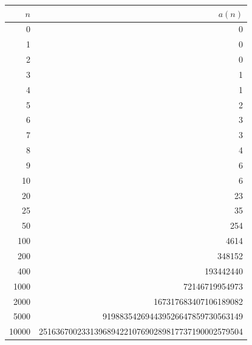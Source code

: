 \begin{tabular}{r r}
$n$ & $a(n)$ \\
\hline
0 & 0 \\
1 & 0 \\
2 & 0 \\
3 & 1 \\
4 & 1 \\
5 & 2 \\
6 & 3 \\
7 & 3 \\
8 & 4 \\
9 & 6 \\
10 & 6 \\
20 & 23 \\
25 & 35 \\
50 & 254 \\
100 & 4614 \\
200 & 348152 \\
400 & 193442440 \\
1000 & 72146719954973 \\
2000 & 167317683407106189082 \\
5000 & 919883542694439526647859730563149 \\
10000 & 251636700233139689422107690289817737190002579504 \\
\end{tabular}
